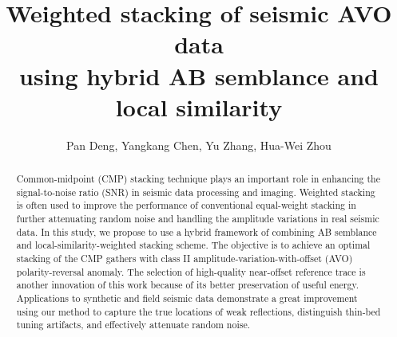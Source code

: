 
\title{Weighted stacking of seismic AVO data \\
using hybrid AB semblance and local similarity}

\renewcommand{\thefootnote}{\fnsymbol{footnote}}


\address{
\footnotemark[1] Department of Earth and Atmospheric Sciences\\
University of Houston\\
Houston, TX 77004, USA \\
\footnotemark[2] Bureau of Economic Geology,\\
John A. and Katherine G. Jackson School of Geosciences \\
The University of Texas at Austin \\
University Station, Box X \\
Austin, TX 78713-8924, USA \\
Pan Deng: dengpan1988@hotmail.com, Yangkang Chen: chenyk1990@gmail.com \\
Yu Zhang: yuz124@gmail.com, Hua-Wei Zhou: hzhou@uh.edu\\

}

\author{Pan Deng\footnotemark[1], Yangkang Chen\footnotemark[2], Yu Zhang\footnotemark[1], Hua-Wei Zhou\footnotemark[1]}


\maketitle

\begin{abstract}
Common-midpoint (CMP) stacking technique plays an important role in enhancing the signal-to-noise ratio (SNR) in seismic data processing and imaging. Weighted stacking is often used to improve the performance of conventional equal-weight stacking in further attenuating random noise and handling the amplitude variations in real seismic data. In this study, we propose to use a hybrid framework of combining AB semblance and local-similarity-weighted stacking scheme. The objective is to achieve an optimal stacking of the CMP gathers with class II amplitude-variation-with-offset (AVO) polarity-reversal anomaly. The selection of high-quality near-offset reference trace is another innovation of this work because of its better preservation of useful energy. Applications to synthetic and field seismic data demonstrate a great improvement using our method to capture the true locations of weak reflections, distinguish thin-bed tuning artifacts, and effectively attenuate random noise. 
\end{abstract}

